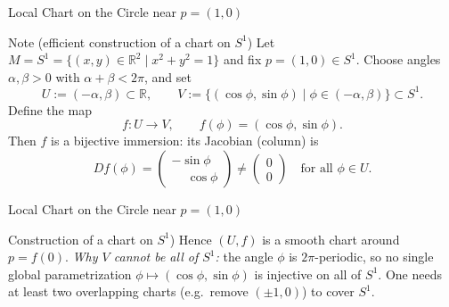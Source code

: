 \begin{frame}{Local Chart on the Circle near \(p=(1,0)\)}
\begin{block}{Note (efficient construction of a chart on \(S^1\))}
Let \(M=S^1=\{(x,y)\in\mathbb{R}^2\mid x^2+y^2=1\}\) and fix \(p=(1,0)\in S^1\).
Choose angles \(\alpha,\beta>0\) with \(\alpha+\beta<2\pi\), and set
\[
U:=(-\alpha,\beta)\subset\mathbb{R},\qquad
V:=\{(\cos\phi,\sin\phi)\mid \phi\in(-\alpha,\beta)\}\subset S^1.
\]
Define the map
\[
f:U\to V,\qquad f(\phi)=(\cos\phi,\sin\phi).
\]
Then \(f\) is a bijective immersion: its Jacobian (column) is
\[
Df(\phi)=
\begin{pmatrix}
-\sin\phi\\[2pt]
\phantom{-}\cos\phi
\end{pmatrix}\neq \begin{pmatrix}
0\\[2pt]
0
\end{pmatrix}\quad\text{for all }\phi\in U.
\]
\end{block}
\end{frame}

\begin{frame}{Local Chart on the Circle near \(p=(1,0)\)}
\begin{block}{Construction of a chart on \(S^1\))}
Hence \((U,f)\) is a smooth chart around \(p=f(0)\).
\emph{Why \(V\) cannot be all of \(S^1\):} the angle \(\phi\) is \(2\pi\)-periodic, so no single global parametrization \(\phi\mapsto (\cos\phi,\sin\phi)\) is injective on all of \(S^1\). One needs at least two overlapping charts (e.g.\ remove \((\pm1,0)\)) to cover \(S^1\).
\end{block}

\begin{center}
\end{center}
\end{frame}


